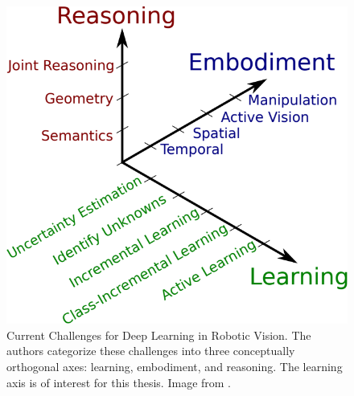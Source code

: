  \begin{figure}[h!]
 	\centering
 	\includegraphics[width=0.6\linewidth]{images/rvchallenges.png}
 	\caption{Current Challenges for Deep Learning in Robotic Vision. The authors categorize these challenges into three conceptually orthogonal axes:
 		learning, embodiment, and reasoning. The learning axis is of interest for this thesis. Image from \cite{surveydeeplimits}.}
 \end{figure}
 
